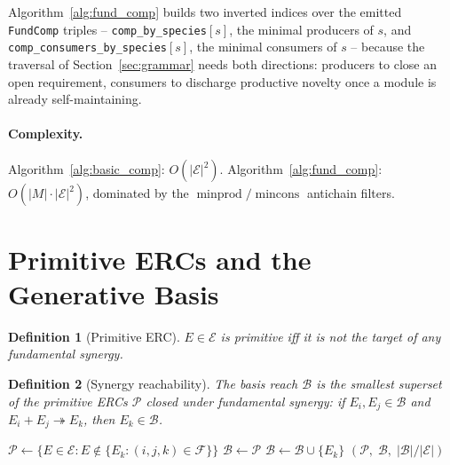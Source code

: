 \documentclass[11pt]{article}
\theoremstyle{plain}
\newtheorem{definition}{Definition}
\theoremstyle{remark}
\newcommand{\minprod}{\operatorname{minprod}}
\newcommand{\mincons}{\operatorname{mincons}}
\newcommand{\E}{\mathcal{E}}
\newcommand{\M}{M}
\begin{document}
Algorithm~\ref{alg:fund_comp} builds two inverted indices over the emitted
\texttt{FundComp} triples -- \texttt{comp\_by\_species}$[s]$, the minimal
producers of $s$, and \texttt{comp\_consumers\_by\_species}$[s]$, the
minimal consumers of $s$ -- because the traversal of
Section~\ref{sec:grammar} needs both directions: producers to close an
open requirement, consumers to discharge productive novelty once a module
is already self-maintaining.

\paragraph{Complexity.} Algorithm~\ref{alg:basic_comp}: $O(|\E|^2)$.
Algorithm~\ref{alg:fund_comp}: $O(|\M| \cdot |\E|^2)$, dominated by the
$\minprod/\mincons$ antichain filters.

\section{Primitive ERCs and the Generative Basis}\label{sec:stage5}

\begin{definition}[Primitive ERC]
$E \in \E$ is \emph{primitive} iff it is not the target of any fundamental
synergy.
\end{definition}

\begin{definition}[Synergy reachability]
The \emph{basis reach} $\mathcal{B}$ is the smallest superset of the
primitive ERCs $\mathcal{P}$ closed under fundamental synergy: if
$E_i,E_j\in\mathcal{B}$ and $E_i+E_j\twoheadrightarrow E_k$, then
$E_k\in\mathcal{B}$.
\end{definition}

\begin{algorithm}[t]
\caption{ComputeGenerators($\E$, $\mathcal{F}$)}\label{alg:gen}
\begin{algorithmic}[1]
\State $\mathcal{P} \leftarrow \{E \in \E : E \notin \{E_k : (i,j,k) \in \mathcal{F}\}\}$
\State $\mathcal{B} \leftarrow \mathcal{P}$
      \State $\mathcal{B} \leftarrow \mathcal{B} \cup \{E_k\}$
    \EndIf
  \EndFor
\EndWhile
\State \Return $(\mathcal{P},\; \mathcal{B},\; |\mathcal{B}|/|\E|)$
\end{algorithmic}
\end{algorithm}
\end{document}
